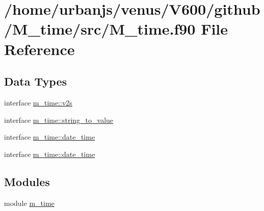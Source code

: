 \hypertarget{M__time_8f90}{}\section{/home/urbanjs/venus/\+V600/github/\+M\+\_\+time/src/\+M\+\_\+time.f90 File Reference}
\label{M__time_8f90}
\subsection*{Data Types}
\begin{DoxyCompactItemize}
\item 
interface \mbox{\hyperlink{interfacem__time_1_1v2s}{m\+\_\+time\+::v2s}}
\item 
interface \mbox{\hyperlink{interfacem__time_1_1string__to__value}{m\+\_\+time\+::string\+\_\+to\+\_\+value}}
\item 
interface \mbox{\hyperlink{structm__time_1_1date__time}{m\+\_\+time\+::date\+\_\+time}}
\item 
interface \mbox{\hyperlink{structm__time_1_1date__time}{m\+\_\+time\+::date\+\_\+time}}
\end{DoxyCompactItemize}
\subsection*{Modules}
\begin{DoxyCompactItemize}
\item 
module \mbox{\hyperlink{namespacem__time}{m\+\_\+time}}
\end{DoxyCompactItemize}
